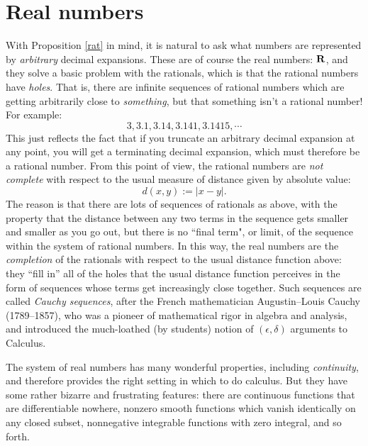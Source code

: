 \documentclass[11pt,oneside]{amsart}
\begin{document}
\section{Real numbers}

With Proposition \ref{rat} in mind, it is natural to ask what numbers are represented by {\em arbitrary} decimal expansions.
These are of course the real numbers: $\mathbf{R}$, and they solve a basic problem with the rationals, which is that the rational numbers have {\em holes}.
That is, there are infinite sequences of rational numbers which are getting arbitrarily close to {\em something}, but that something isn't a rational number!
For example:
\[
	3, 3.1, 3.14, 3.141, 3.1415, \cdots
\]
This just reflects the fact that if you truncate an arbitrary decimal expansion at any point, you will get a terminating decimal expansion, 
which must therefore be a rational number.  
From this point of view, the rational numbers are {\em not complete} with respect to the usual measure of distance given by absolute value:
\[
	d(x,y) := |x - y|.
\]
The reason is that there are lots of sequences of rationals as above, with the property that the distance between any two terms
in the sequence gets smaller and smaller as you go out, but there is no ``final term", or limit, of the sequence within the system of 
rational numbers.  In this way, the real numbers are the {\em completion} of the rationals with respect to the usual distance function above:
they ``fill in'' all of the holes that the usual distance function perceives in the form of sequences whose terms get increasingly close together.
Such sequences are called {\em Cauchy sequences}, after the French mathematician Augustin--Louis Cauchy (1789--1857), who
was a pioneer of mathematical rigor in algebra and analysis,
 and introduced the much-loathed (by students) notion of $(\epsilon,\delta)$
arguments to Calculus.

The system of real numbers has many wonderful properties, including {\em continuity}, and therefore provides the right setting
in which to do calculus.  But they have some rather bizarre and frustrating features: there are continuous functions that are differentiable 
nowhere, nonzero smooth functions which vanish identically on any closed subset, nonnegative integrable functions with zero integral, and so forth.
\end{document}
